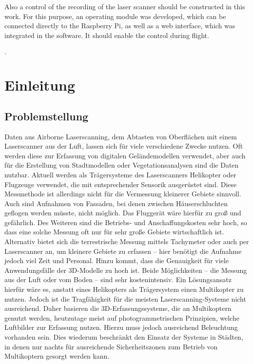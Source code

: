 \documentclass[a4paper,12pt,bibliography=totoc, listof=totoc,titlepage,pointlessnumbers]{scrreprt}
\begin{document}
Also a control of the recording of the laser scanner should be constructed in this work. For this purpose, an operating module was developed, which can be connected directly to the Rasp\-berry Pi, as well as a web interface, which was integrated in the software. It should enable the control during flight.


\providecommand{\citeTwo}[4]{\citep[{\citealp[#1]{#2};}][#3]{#4}} 
\providecommand{\citeThree}[6]{\citep[{\citealp[#1]{#2}; \citealp[#3]{#4};}][#5]{#6}} 
\providecommand{\citeFour}[8]{\citep[{\citealp[#1]{#2}; \citealp[#3]{#4}; \citealp[#5]{#6};}][#7]{#8}}.

\newpage

\tableofcontents
\newpage

\setcounter{page}{1} 

\chapter{Einleitung}

\section{Problemstellung}
Daten aus Air\-borne Laser\-scan\-ning, dem Abtasten von Oberflächen mit einem Laser\-scan\-ner aus der Luft, lassen sich für viele verschiedene Zwecke nutzen. Oft werden diese zur Erfassung von digitalen Geländemodellen verwendet, aber auch für die Erstellung von Stadtmodellen oder Vegetationsanalysen sind die Daten nutzbar. Aktuell werden als Trägersysteme des Laser\-scan\-ners Helikopter oder Flugzeuge verwendet, die mit entsprechender Sensorik ausgerüstet sind. Diese Messmethode ist allerdings nicht für die Vermessung kleinerer Gebiete sinnvoll. Auch sind Aufnahmen von Fassaden, bei denen zwischen Häuserschluchten geflogen werden müsste, nicht möglich. Das Fluggerät wäre hierfür zu groß und gefährlich. Des Weiteren sind die Betriebs- und Anschaffungskosten sehr hoch, so dass eine solche Messung oft nur für sehr große Gebiete wirtschaftlich ist. Alternativ bietet sich die terrestrische Messung mittels Tachymeter oder auch per Laser\-scan\-ner an, um kleinere Gebiete zu erfassen -- hier benötigt die Aufnahme jedoch viel Zeit und Personal. Hinzu kommt, dass die Genauigkeit für viele Anwendungsfälle der 3D-Modelle zu hoch ist. Beide Möglichkeiten -- die Messung aus der Luft oder vom Boden -- sind sehr kostenintensiv. Ein Lösungsansatz hierfür wäre es, anstatt eines Helikopters als Trägersystem einen Multikopter zu nutzen. Jedoch ist die Tragfähigkeit für die meisten Laser\-scan\-ning-Systeme nicht ausreichend. Daher basieren die 3D-Erfassungssysteme, die an Multikoptern genutzt werden, heutzutage meist auf photogrammetrischen Prinzipien, welche Luftbilder zur Erfassung nutzen. Hierzu muss jedoch ausreichend Beleuchtung vorhanden sein. Dies wiederum beschränkt den Einsatz der Systeme in Städten, in denen nur nachts für ausreichende Sicherheitszonen zum Betrieb von Multikoptern gesorgt werden kann. \citep{carlos}
\end{document}
